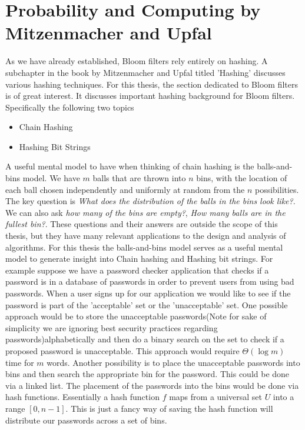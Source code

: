 \documentclass[MScCS]{uccthesis}
\begin{document}
\section{Probability and Computing by Mitzenmacher and Upfal}
As we have already established, Bloom filters rely entirely on hashing. A subchapter in the book by Mitzenmacher and Upfal \cite{mitzenmacher2017probability} titled 'Hashing' discusses various hashing techniques. For this thesis, the section dedicated to Bloom filters is of great interest. It discusses important hashing background for Bloom filters. Specifically the following two topics
\begin{itemize}
    \item Chain Hashing
    \item Hashing Bit Strings
\end{itemize}
A useful mental model to have when thinking of chain hashing is the balls-and-bins model. We have $m$ balls that are thrown into $n$ bins, with the location of each ball chosen independently and uniformly at random from the $n$ possibilities. The key question is \textit{What does the distribution of the balls in the bins look like?}. We can also ask \textit{how many of the bins are empty?}, \textit{How many balls are in the fullest bin?}. These questions and their answers are outside the scope of this thesis, but they have many relevant applications to the design and analysis of algorithms. For this thesis the balls-and-bins model serves as a useful mental model to generate insight into Chain hashing and Hashing bit strings. For example suppose we have a password checker application that checks if a password is in a database of passwords in order to prevent users from using bad passwords. When a user signs up for our application we would like to see if the password is part of the 'acceptable' set or the 'unacceptable' set.  One possible approach would be to store the unacceptable passwords(Note for sake of simplicity we are ignoring best security practices regarding passwords)alphabetically and then do a binary search on the set to check if a proposed password is unacceptable. This approach would require $\varTheta (\log m )$ time for $m$ words. Another possibility is to place the unacceptable passwords into bins and then search the appropriate bin for the password. This could be done via a linked list. The placement of the passwords into the bins would be done via hash functions. Essentially a hash function $f$ maps from a universal set $U$ into a range $[0, n - 1]$. This is just a fancy way of saving the hash function will distribute our passwords across a set of bins.
\end{document}
